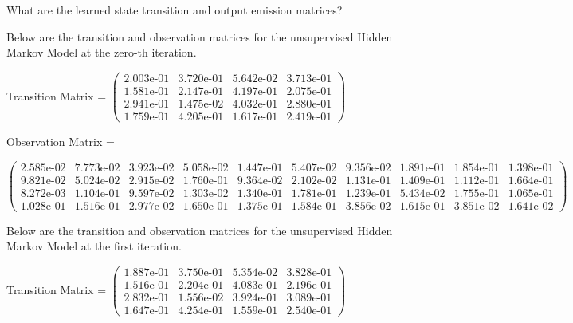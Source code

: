 What are the learned state transition and output emission matrices?

Below are the transition and observation matrices for the unsupervised Hidden Markov Model at the zero-th iteration.

Transition Matrix = \small $\begin{pmatrix}
2.003\text{e-}01 & 3.720\text{e-}01 & 5.642\text{e-}02 & 3.713\text{e-}01\\
1.581\text{e-}01 & 2.147\text{e-}01 & 4.197\text{e-}01 & 2.075\text{e-}01\\
2.941\text{e-}01 & 1.475\text{e-}02 & 4.032\text{e-}01 & 2.880\text{e-}01\\
1.759\text{e-}01 & 4.205\text{e-}01 & 1.617\text{e-}01 & 2.419\text{e-}01 
\end{pmatrix}$
\normalsize

Observation Matrix =

\small
$\begin{pmatrix}
2.585\text{e-}02 & 7.773\text{e-}02 & 3.923\text{e-}02 & 5.058\text{e-}02 & 1.447\text{e-}01 & 5.407\text{e-}02 & 9.356\text{e-}02 & 1.891\text{e-}01 & 1.854\text{e-}01 & 1.398\text{e-}01\\
9.821\text{e-}02 & 5.024\text{e-}02 & 2.915\text{e-}02 & 1.760\text{e-}01 & 9.364\text{e-}02 & 2.102\text{e-}02 & 1.131\text{e-}01 & 1.409\text{e-}01 & 1.112\text{e-}01 & 1.664\text{e-}01\\
8.272\text{e-}03 & 1.104\text{e-}01 & 9.597\text{e-}02 & 1.303\text{e-}02 & 1.340\text{e-}01 & 1.781\text{e-}01 & 1.239\text{e-}01 & 5.434\text{e-}02 & 1.755\text{e-}01 & 1.065\text{e-}01\\
1.028\text{e-}01 & 1.516\text{e-}01 & 2.977\text{e-}02 & 1.650\text{e-}01 & 1.375\text{e-}01 & 1.584\text{e-}01 & 3.856\text{e-}02 & 1.615\text{e-}01 & 3.851\text{e-}02 & 1.641\text{e-}02 
\end{pmatrix}$
\normalsize
\medskip

Below are the transition and observation matrices for the unsupervised Hidden Markov Model at the first iteration.

Transition Matrix = \small $\begin{pmatrix}
1.887\text{e-}01 & 3.750\text{e-}01 & 5.354\text{e-}02 & 3.828\text{e-}01\\
1.516\text{e-}01 & 2.204\text{e-}01 & 4.083\text{e-}01 & 2.196\text{e-}01\\
2.832\text{e-}01 & 1.556\text{e-}02 & 3.924\text{e-}01 & 3.089\text{e-}01\\
1.647\text{e-}01 & 4.254\text{e-}01 & 1.559\text{e-}01 & 2.540\text{e-}01   
\end{pmatrix}$
\normalsize

